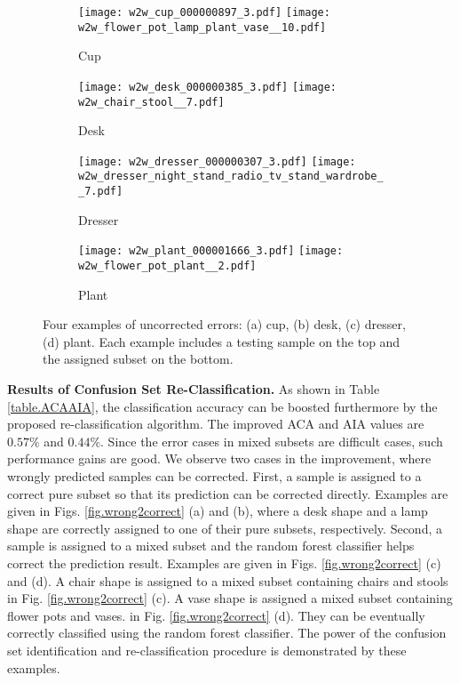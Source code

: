 \documentclass[preprint,12pt]{elsarticle}
\begin{document}
\begin{figure}[ht!]
\centering
\begin{subfigure}[b] {0.4\linewidth}
\centering
\texttt{[image: w2w\_cup\_000000897\_3.pdf]}
\texttt{[image: w2w\_flower\_pot\_lamp\_plant\_vase\_\_10.pdf]}
\caption{Cup}
\end{subfigure}
\centering
\begin{subfigure}[b] {0.4\linewidth}
\centering
\texttt{[image: w2w\_desk\_000000385\_3.pdf]}
\texttt{[image: w2w\_chair\_stool\_\_7.pdf]}
\caption{Desk}
\end{subfigure}
\centering
\begin{subfigure}[b] {0.4\linewidth}
\centering
\texttt{[image: w2w\_dresser\_000000307\_3.pdf]}
\texttt{[image: w2w\_dresser\_night\_stand\_radio\_tv\_stand\_wardrobe\_\_7.pdf]}
\caption{Dresser}
\end{subfigure}
\centering
\begin{subfigure}[b] {0.4\linewidth}
\centering
\texttt{[image: w2w\_plant\_000001666\_3.pdf]}
\texttt{[image: w2w\_flower\_pot\_plant\_\_2.pdf]}
\caption{Plant}
\end{subfigure}
\caption{Four examples of uncorrected errors: (a) cup, (b) desk, (c)
dresser, (d) plant. Each example includes a testing sample on the top
and the assigned subset on the bottom. }\label{fig.wrong2wrong}
\vspace{-1.5em}
\end{figure}

{\bf Results of Confusion Set Re-Classification.} As shown in Table
\ref{table.ACAAIA}, the classification accuracy can be boosted
furthermore by the proposed re-classification algorithm. The improved
ACA and AIA values are $0.57\%$ and $0.44\%$.  Since the error cases in
mixed subsets are difficult cases, such performance gains are good. We
observe two cases in the improvement, where wrongly predicted samples
can be corrected. First, a sample is assigned to a correct pure subset
so that its prediction can be corrected directly.  Examples are given in
Figs.  \ref{fig.wrong2correct} (a) and (b), where a desk shape and a
lamp shape are correctly assigned to one of their pure subsets,
respectively.  Second, a sample is assigned to a mixed subset and the
random forest classifier helps correct the prediction result. Examples
are given in Figs. \ref{fig.wrong2correct} (c) and (d).  A chair shape
is assigned to a mixed subset containing chairs and stools in Fig.
\ref{fig.wrong2correct} (c). A vase shape is assigned a mixed subset
containing flower pots and vases.  in Fig.  \ref{fig.wrong2correct} (d).
They can be eventually correctly classified using the random forest
classifier.  The power of the confusion set identification and
re-classification procedure is demonstrated by these examples. 
\end{document}
